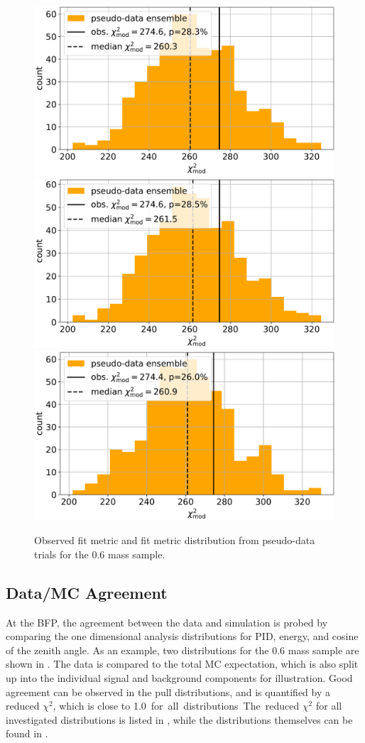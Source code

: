 \begin{figure}[h]
    \includegraphics[width=0.32\linewidth]{figures/results/blind_fits/full_blind_fit_0.3_GeV_gauss_plus_poisson_step_3_4-1.png}
    \includegraphics[width=0.32\linewidth]{figures/results/blind_fits/full_blind_fit_0.6_GeV_gauss_plus_poisson_step_3_4-1.png}
    \includegraphics[width=0.32\linewidth]{figures/results/blind_fits/full_blind_fit_1.0_GeV_gauss_plus_poisson_step_3_4-1.png}
	\caption[Pseudo-data trials fit metric distribution (\SI{0.6}{\gev})]{Observed fit metric and fit metric distribution from pseudo-data trials for the \SI{0.6}{\gev} mass sample.}
\end{figure}


\subsection{Data/MC Agreement}

At the BFP, the agreement between the data and simulation is probed by comparing the one dimensional analysis distributions for PID, energy, and cosine of the zenith angle. As an example, two distributions for the \SI{0.6}{\gev} mass sample are shown in . The data is compared to the total MC expectation, which is also split up into the individual signal and background components for illustration. Good agreement can be observed in the pull distributions, and is quantified by a reduced $\chi^2$, which is close to \SI{1.0} for all distributions. The reduced $\chi^2$ for all investigated distributions is listed in , while the distributions themselves can be found in .

